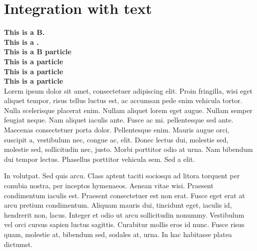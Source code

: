 \documentclass[12pt,a4paper]{article}
\newcommand{\pd}{\HepParticle{d}{}{}}
\newcommand{\pB}{\HepParticle{B}{}{}}
\begin{document}


\section{Integration with text}
\textbf{This is a B.}\\
\textbf{This is a .}\\

\textbf{This is a B particle}\\
\textbf{This is a  particle}\\
\textbf{This is a  particle}\\
\textbf{This is a  particle}\\

Lorem ipsum dolor sit amet, consectetuer adipiscing elit. Proin fringilla, wisi
eget aliquet tempor, risus tellus luctus est, ac accumsan pede enim vehicula
tortor. Nulla  scelerisque placerat enim. Nullam aliquet
lorem eget augue. Nullam semper feugiat neque. Nam aliquet iaculis ante. Fusce
ac mi.  pellentesque sed ante. Maecenas consectetuer
porta dolor. Pellentesque enim. Mauris augue orci, suscipit a, vestibulum nec,
 congue ac, elit. Donec lectus dui, molestie sed,
molestie sed, sollicitudin nec, justo. Morbi porttitor odio at urna. Nam
bibendum dui tempor lectus. Phasellus  porttitor
vehicula sem. Sed a elit.

In volutpat. Sed quis arcu. Class aptent taciti sociosqu ad litora torquent per
conubia nostra, per inceptos  hymenaeos. Aenean vitae
wisi. Praesent condimentum iaculis est. Praesent consectetuer est non erat.
Fusce eget erat at arcu pretium condimentum. Aliquam \HepGenAntiParticle{\ell}{}{+}
mauris dui, tincidunt eget, iaculis id, hendrerit non, lacus. Integer et odio ut
arcu sollicitudin nonummy. Vestibulum vel orci cursus sapien luctus
 sagittis. Curabitur mollis eros id nunc. Fusce risus
quam, molestie at, bibendum sed, sodales at, urna. In hac habitasse platea
 dictumst.
\end{document}
